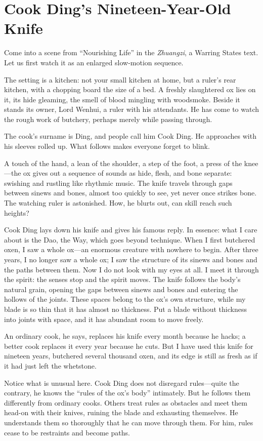 \section{Cook Ding's Nineteen-Year-Old Knife}
Come into a scene from ``Nourishing Life'' in the \textit{Zhuangzi}, a Warring States text. Let us first watch it as an enlarged slow-motion sequence.

The setting is a kitchen: not your small kitchen at home, but a ruler's rear kitchen, with a chopping board the size of a bed. A freshly slaughtered ox lies on it, its hide gleaming, the smell of blood mingling with woodsmoke. Beside it stands its owner, Lord Wenhui, a ruler with his attendants. He has come to watch the rough work of butchery, perhaps merely while passing through.

The cook's surname is Ding, and people call him Cook Ding. He approaches with his sleeves rolled up. What follows makes everyone forget to blink.

A touch of the hand, a lean of the shoulder, a step of the foot, a press of the knee---the ox gives out a sequence of sounds as hide, flesh, and bone separate: swishing and rustling like rhythmic music. The knife travels through gaps between sinews and bones, almost too quickly to see, yet never once strikes bone. The watching ruler is astonished. How, he blurts out, can skill reach such heights?

Cook Ding lays down his knife and gives his famous reply. In essence: what I care about is the Dao, the Way, which goes beyond technique. When I first butchered oxen, I saw a whole ox---an enormous creature with nowhere to begin. After three years, I no longer saw a whole ox; I saw the structure of its sinews and bones and the paths between them. Now I do not look with my eyes at all. I meet it through the spirit: the senses stop and the spirit moves. The knife follows the body's natural grain, opening the gaps between sinews and bones and entering the hollows of the joints. These spaces belong to the ox's own structure, while my blade is so thin that it has almost no thickness. Put a blade without thickness into joints with space, and it has abundant room to move freely.

An ordinary cook, he says, replaces his knife every month because he hacks; a better cook replaces it every year because he cuts. But I have used this knife for nineteen years, butchered several thousand oxen, and its edge is still as fresh as if it had just left the whetstone.

Notice what is unusual here. Cook Ding does not disregard rules---quite the contrary, he knows the ``rules of the ox's body'' intimately. But he follows them differently from ordinary cooks. Others treat rules as obstacles and meet them head-on with their knives, ruining the blade and exhausting themselves. He understands them so thoroughly that he can move through them. For him, rules cease to be restraints and become paths.

